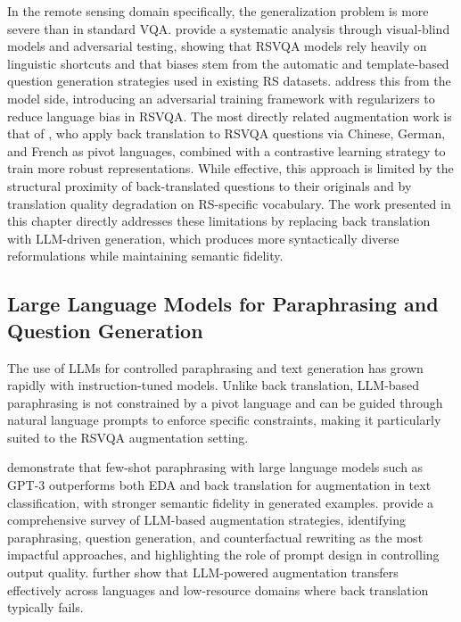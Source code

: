 In the remote sensing domain specifically, the
generalization problem is more severe than in standard
VQA. \textcite{chappuis2025langbias} provide a systematic
analysis through visual-blind models and adversarial
testing, showing that RSVQA models rely heavily on
linguistic shortcuts and that biases stem from the
automatic and template-based question generation
strategies used in existing RS datasets.
\textcite{yuan2023adversarial} address this from the model
side, introducing an adversarial training framework with
regularizers to reduce language bias in RSVQA.
The most directly related augmentation work is that of
\textcite{yuan2023multilingual}, who apply back translation
to RSVQA questions via Chinese, German, and French as
pivot languages, combined with a contrastive learning
strategy to train more robust representations. While
effective, this approach is limited by the structural
proximity of back-translated questions to their originals
and by translation quality degradation on RS-specific
vocabulary. The work presented in this chapter directly
addresses these limitations by replacing back translation
with LLM-driven generation, which produces more
syntactically diverse reformulations while maintaining
semantic fidelity.
 
\subsection{Large Language Models for Paraphrasing and Question Generation}
\label{sec:chap3_rw_llm}
 
The use of LLMs for controlled paraphrasing and text
generation has grown rapidly with instruction-tuned
models. Unlike back translation, LLM-based paraphrasing
is not constrained by a pivot language and can be guided
through natural language prompts to enforce specific
constraints, making it
particularly suited to the RSVQA augmentation setting.
 
\textcite{meng2022lmcppf} demonstrate that few-shot
paraphrasing with large language models such as GPT-3
outperforms both EDA and back translation for
augmentation in text classification, with stronger
semantic fidelity in generated examples.
\textcite{dai2023llmaugsurvey} provide a comprehensive
survey of LLM-based augmentation strategies, identifying
paraphrasing, question generation, and counterfactual
rewriting as the most impactful approaches, and
highlighting the role of prompt design in controlling
output quality. \textcite{whitehouse2023llmcrosslingual}
further show that LLM-powered augmentation transfers
effectively across languages and low-resource domains
where back translation typically fails. %
 
